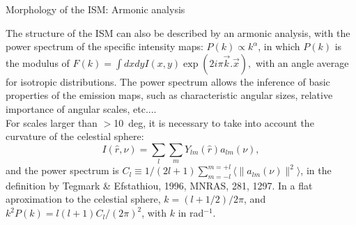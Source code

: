{\begin{frame}
\end{frame}

\begin{frame}{Morphology of the ISM: Armonic analysis} 

The structure of the ISM can also be described by an armonic analysis,
with the power spectrum of the specific intensity maps: \( P(k)
\propto k^{\alpha} \), in which  $P(k)$ is the modulus of  \( F(k) = \int
dxdy I(x,y) \exp(2i\pi
\vec{k}.\vec{x}), \) with an angle average for isotropic
distributions. The power spectrum allows the inference of basic
properties of the emission maps, such as characteristic angular sizes,
relative importance of angular scales, etc....  \\

For scales larger than $>$10~deg, it is necessary to take into account
the curvature of the celestial sphere:
\[I(\hat{r},\nu) = \sum_l\sum_m Y_{lm}(\hat{r}) a_{lm}(\nu),
\] and the power spectrum is 
\(
C_l \equiv 1/(2l+1) \sum_{m=-l}^{m=+l} \langle
\|a_{lm}(\nu)\|^2 \rangle 
\), in the definition by  Tegmark \& Efstathiou, 1996, MNRAS, 281,
1297.  In a flat aproximation to the celestial sphere, $k =
(l+1/2)/2\pi$, and $k^2P(k) = l (l+1) C_l / (2\pi)^2$, with $k$ in
rad$^{-1}$.

\end{frame}

}

